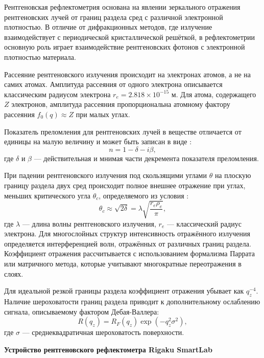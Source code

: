 \documentclass[a4paper]{article}
\begin{document}
Рентгеновская рефлектометрия основана на явлении зеркального отражения рентгеновских лучей от границ раздела сред с различной электронной плотностью. В отличие от дифракционных методов, где излучение взаимодействует с периодической кристаллической решёткой, в рефлектометрии основную роль играет взаимодействие рентгеновских фотонов с электронной плотностью материала.

Рассеяние рентгеновского излучения происходит на электронах атомов, а не на самих атомах. Амплитуда рассеяния от одного электрона описывается классическим радиусом электрона $r_e = 2.818 \times 10^{-15}$ м. Для атома, содержащего $Z$ электронов, амплитуда рассеяния пропорциональна атомному фактору рассеяния $f_0(q) \approx Z$ при малых углах.

Показатель преломления для рентгеновских лучей в веществе отличается от единицы на малую величину и может быть записан в виде \cite{30}:
\begin{equation}
n = 1 - \delta - i\beta,
\end{equation}
где $\delta$ и $\beta$ — действительная и мнимая части декремента показателя преломления.

При падении рентгеновского излучения под скользящими углами $\theta$ на плоскую границу раздела двух сред происходит полное внешнее отражение при углах, меньших критического угла $\theta_c$, определяемого из условия \cite{30}:
\begin{equation}
\theta_c \approx \sqrt{2\delta} = \lambda\sqrt{\frac{r_e \rho_e}{\pi}},
\end{equation}
где $\lambda$ — длина волны рентгеновского излучения, $r_e$ — классический радиус электрона.
Для многослойных структур интенсивность отражённого излучения определяется интерференцией волн, отражённых от различных границ раздела. Коэффициент отражения рассчитывается с использованием формализма Паррата \cite{30} или матричного метода, которые учитывают многократные переотражения в слоях.

Для идеальной резкой границы раздела коэффициент отражения убывает как $q_z^{-4}$. Наличие шероховатости границ раздела приводит к дополнительному ослаблению сигнала, описываемому фактором Дебая-Валлера:
\begin{equation}
R(q_z) = R_F(q_z) \exp(-q_z^2 \sigma^2),
\end{equation}
где $\sigma$ — среднеквадратичная шероховатость поверхности.

\textbf{Устройство рентгеновского рефлектометра Rigaku SmartLab}
\end{document}

